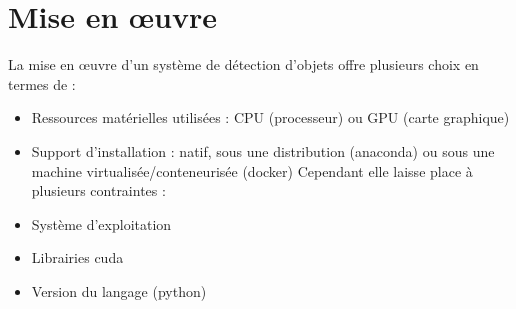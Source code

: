 \documentclass[debug,nodate,hideweeklyreports,noposter]{polytech/polytech}
\begin{document}
\section{Mise en œuvre}

La mise en œuvre d’un système de détection d’objets offre plusieurs choix en termes de :
\begin{itemize}
\item Ressources matérielles utilisées : CPU (processeur) ou GPU (carte graphique)
\item Support d’installation : natif, sous une distribution (anaconda) ou sous une machine virtualisée/conteneurisée (docker)
Cependant elle laisse place à plusieurs contraintes :
\item Système d’exploitation
\item Librairies \gls{cuda}
\item Version du langage (python)
\end{itemize}
\end{document}

